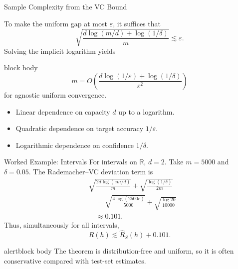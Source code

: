 \documentclass[aspectratio=169,10pt]{beamer}
\newcommand{\Rhat}{\widehat{R}_S}
\newcommand{\eps}{\varepsilon}
\newcommand{\OrangeBox}[1]{%
  \begin{beamercolorbox}[rounded=true,sep=0.22cm,wd=\linewidth]{alertblock body}
    #1
  \end{beamercolorbox}%
}
\begin{document}
\begin{frame}[t]{Sample Complexity from the VC Bound}
  \vspace{-0.04cm}
  {\footnotesize
  To make the uniform gap at most $\eps$, it suffices that
  \[
    \sqrt{\frac{d\log(m/d)+\log(1/\delta)}{m}}
    \lesssim\eps.
  \]
  Solving the implicit logarithm yields
  \begin{beamercolorbox}[rounded=true,sep=0.10cm,wd=\linewidth]{block body}
    \[
      \boxed{
      m=O\!\left(
        \frac{d\log(1/\eps)+\log(1/\delta)}{\eps^2}
      \right)}
    \]
    for agnostic uniform convergence.
  \end{beamercolorbox}
  \vspace{0.02cm}
  \begin{itemize}
    \setlength{\itemsep}{0.03cm}
    \item Linear dependence on capacity $d$ up to a logarithm.
    \item Quadratic dependence on target accuracy $1/\eps$.
    \item Logarithmic dependence on confidence $1/\delta$.
  \end{itemize}}
\end{frame}

\begin{frame}[t]{Worked Example: Intervals}
  \vspace{0.01cm}
  For intervals on $\mathbb{R}$, $d=2$. Take $m=5000$ and $\delta=0.05$. The Rademacher--VC deviation term is
  \begin{align*}
    &\sqrt{\frac{2d\log(em/d)}{m}}
      +\sqrt{\frac{\log(1/\delta)}{2m}}\\
    &\quad=\sqrt{\frac{4\log(2500e)}{5000}}
      +\sqrt{\frac{\log 20}{10000}}\\
    &\quad\approx 0.101.
  \end{align*}
  Thus, simultaneously for all intervals,
  \[
    R(h)\lesssim \Rhat(h)+0.101.
  \]
  \vspace{0.04cm}
  \OrangeBox{The theorem is distribution-free and uniform, so it is often conservative compared with test-set estimates.}
\end{frame}
\end{document}
